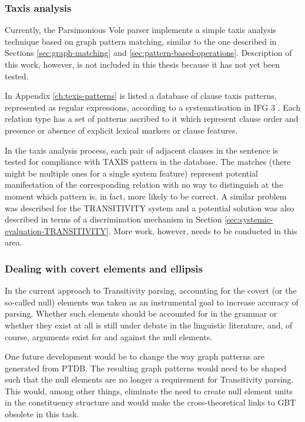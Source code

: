 \subsubsection{Taxis analysis}

    Currently, the Parsimonious Vole parser implements a simple taxis analysis technique based on graph pattern matching, similar to the one described in Sections \ref{sec:graph-matching} and \ref{sec:pattern-based-operations}. %
    Description of this work, however, is not included in this thesis because it has not yet been tested.%

    In Appendix \ref{ch:texis-patterns} is listed a database of clause taxis patterns, represented as regular expressions, according to a systematisation in IFG 3 \citep{Halliday2004}. Each relation type has a set of patterns ascribed to it which represent clause order and presence or absence of explicit lexical markers or clause features. 

    In the taxis analysis process, each pair of adjacent clauses in the sentence is tested for compliance with TAXIS pattern in the database. The matches (there might be multiple ones for a single system feature) represent potential manifestation of the corresponding relation with no way to distinguish at the moment which pattern is, in fact, more likely to be correct. A similar problem was described for the TRANSITIVITY system and a potential solution was also described in terms of a discrimination mechanism in Section \ref{sec:systemic-evaluation-TRANSITIVITY}. More work, however, needs to be conducted in this area. 

\subsubsection{Dealing with covert elements and ellipsis}
    
    In the current approach to Transitivity parsing, accounting for the covert (or the so-called null) elements was taken as an instrumental goal to increase accuracy of parsing. Whether such elements should be accounted for in the grammar or whether they exist at all is still under debate in the linguistic literature, and, of course, arguments exist for and against the null elements.
    
    One future development would be to change the way graph patterns are generated from PTDB. The resulting graph patterns would need to be shaped such that the null elements are no longer a requirement for Transitivity parsing. This would, among other things, eliminate the need to create null element units in the constituency structure and would make the cross-theoretical links to GBT obsolete in this task. 

